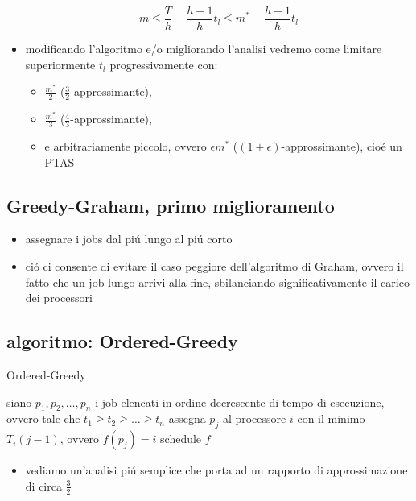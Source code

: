 \begin{flushleft}
\begin{itemize}
			$$m\leq\frac{T}{h}+\frac{h-1}{h}t_l\leq m^*+\frac{h-1}{h}t_l$$
		\item modificando l'algoritmo e/o migliorando l'analisi vedremo come limitare superiormente $t_l$ progressivamente con:
		\begin{itemize}
			\item $\frac{m^*}{2}$ ($\frac{3}{2}$-approssimante),
			\item $\frac{m^*}{3}$ ($\frac{4}{3}$-approssimante),
			\item e arbitrariamente piccolo, ovvero $\epsilon m^*$ ($(1+\epsilon)$-approssimante), cio\'e un PTAS 
		\end{itemize}
	\end{itemize}
\end{flushleft}


\subsection*{Greedy-Graham, primo miglioramento}
\begin{flushleft}
	\begin{itemize}
		\item assegnare i jobs dal pi\'u lungo al pi\'u corto
		\item ci\'o ci consente di evitare il caso peggiore dell'algoritmo di Graham, ovvero il fatto che un job lungo arrivi alla fine, sbilanciando significativamente il carico dei processori
	\end{itemize}
\end{flushleft}


\subsection*{algoritmo: Ordered-Greedy}
\begin{flushleft}
	\begin{algorithm}
		\caption{Ordered-Greedy}
		\begin{algorithmic}
			\STATE siano $p_1,p_2,\ldots,p_n$ i job elencati in ordine decrescente di tempo di
			esecuzione, ovvero tale che $t_1\geq t_2\geq\ldots\geq t_n$
				\STATE assegna $p_j$ al processore $i$ con il minimo $T_i(j-1)$, ovvero $f(p_j)=i$
			\ENDFOR
			\RETURN schedule $f$
		\end{algorithmic}
	\end{algorithm}
	\begin{itemize}
		\item vediamo un'analisi pi\'u semplice che porta ad un rapporto di approssimazione di circa $\frac{3}{2}$
	\end{itemize}
\end{flushleft}

